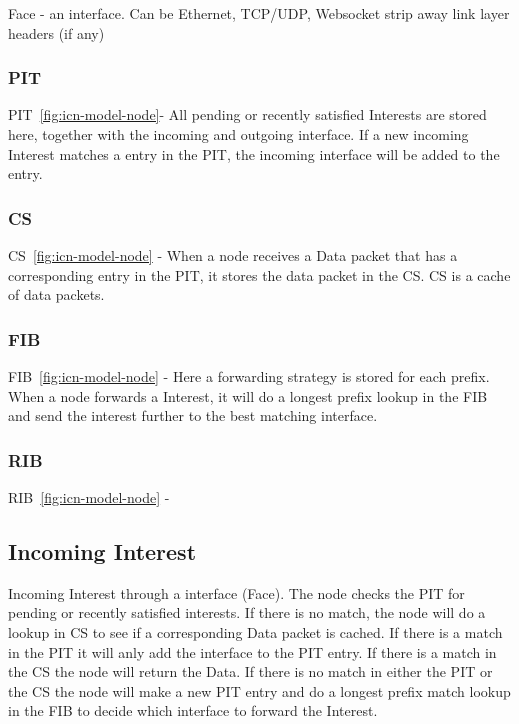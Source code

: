Face - an interface. Can be Ethernet, TCP/UDP, Websocket
strip away link layer headers (if any)

\subsubsection{\gls{PIT}}\label{pit}
\gls{PIT}~\autoref{fig:icn-model-node}- All pending or recently satisfied Interests are stored here, together with the incoming and outgoing interface.
If a new incoming Interest matches a entry in the \gls{PIT}, the incoming interface will be added to the entry. 


\subsubsection{\gls{CS}}\label{content-store}
\gls{CS}~\autoref{fig:icn-model-node} - When a node receives a Data packet that has a corresponding entry in the \gls{PIT}, it stores the data packet in the \gls{CS}. \gls{CS} is a cache of data packets.


\subsubsection{\gls{FIB}}\label{fib}
\gls{FIB}~\autoref{fig:icn-model-node} - Here a forwarding strategy is stored for each prefix. 
When a node forwards a Interest, it will do a longest prefix lookup in the \gls{FIB} and send the interest further to the best matching interface.


\subsubsection{\gls{RIB}}\label{rib}
\gls{RIB}~\autoref{fig:icn-model-node} - 

 
\subsection{Incoming Interest}
Incoming Interest through a interface (Face). The node checks the \gls{PIT} for pending or recently satisfied interests. 
If there is no match, the node will do a lookup in \gls{CS} to see if a corresponding Data packet is cached. 
If there is a match in the \gls{PIT} it will anly add the interface to the \gls{PIT} entry. If there is a match in the \gls{CS} the node will return the Data. 
If there is no match in either the \gls{PIT} or the \gls{CS} the node will make a new \gls{PIT} entry and do a longest prefix match lookup in the \gls{FIB} to decide which interface to forward the Interest.

